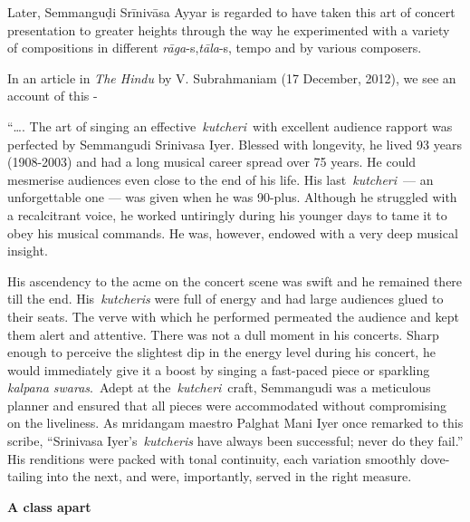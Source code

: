 Later, Semmanguḍi Srīnivāsa Ayyar is regarded to have taken this art of concert presentation to greater heights through the way he experimented with a variety of compositions in different \textit{rāga}-s,\break \textit{tāla}-s, tempo and by various composers.

In an article in \textit{The Hindu} by V. Subrahmaniam (17 December, 2012), we see an account of this -

\begin{myquote}
“…. The art of singing an effective \textit{kutcheri} with excellent audience rapport was perfected by Semmangudi Srinivasa Iyer. Blessed with longevity, he lived 93 years (1908-2003) and had a long musical career spread over 75 years. He could mesmerise audiences even close to the end of his life. His last \textit{kutcheri} — an unforgettable one — was given when he was 90-plus. Although he struggled with a recalcitrant voice, he worked untiringly during his younger days to tame it to obey his musical commands. He was, however, endowed with a very deep musical insight.
\end{myquote}

\begin{myquote}
His ascendency to the acme on the concert scene was swift and he remained there till the end. His \textit{kutcheris} were full of energy and had large audiences glued to their seats. The verve with which he performed permeated the audience and kept them alert and attentive. There was not a dull moment in his concerts. Sharp enough to perceive the slightest dip in the energy level during his concert, he would immediately give it a boost by singing a fast-paced piece or sparkling \textit{kalpana swaras}. Adept at the \textit{kutcheri} craft, Semmangudi was a meticulous planner and ensured that all pieces were accommodated without compromising on the liveliness. As mridangam maestro Palghat Mani Iyer once remarked to this scribe, “Srinivasa Iyer’s \textit{kutcheris} have always been successful; never do they fail.” His renditions were packed with tonal continuity, each variation smoothly dove-tailing into the next, and were, importantly, served in the right measure.
\end{myquote}

\begin{myquote}
\textbf{A class apart}
\end{myquote}

